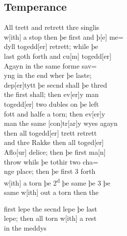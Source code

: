 \documentclass[12pt,letter]{article} %
\newcommand{\srcpg}[1]{
    \noindent{
        \color{Gray}{\rule[0.5ex]{\linewidth}{1pt}~#1} 
    
    }
}
\begin{document}
\srcpg{70}

\subsection{Temperance}
 All trett and retrett thre singlis\\
w{[}ith{]} a stop then þe first and þ{[}e{]} me=\\
dyll togedd{[}er{]} retrett; while þe\\
last goth forth and cu{[}m{]} togedd{[}er{]}\\
Agayn in the same forme sav=\\
yng in the end wher þe laste;\\
dep{[}er{]}tytt þe secnd shall þe thred\\
the first shall; then ev{[}er{]}y man\\
togedd{[}er{]} two dubles on þe left\\
fott and halfe a torn; then ev{[}er{]}y\\
man the same {[}con{]}tr{[}ar{]}y wyes agayn\\
then all togedd{[}er{]} trett retrett\\
and thre Rakke then all toged{[}er{]}\\
Aflo{[}ur{]} delice; then þe first ma{[}n{]}\\
throw whils þe tothir two cha=\\
nge place; then þe first 3 forth\\
w{[}ith{]} a torn þe 2\textsuperscript{d} þe same þe 3 þe\\
same w{[}ith{]} out a torn then the 
\srcpg{71} 
first lepe the secnd lepe þe last\\
lepe; then all torn w{[}ith{]} a rest\\
in the meddys
\end{document}
